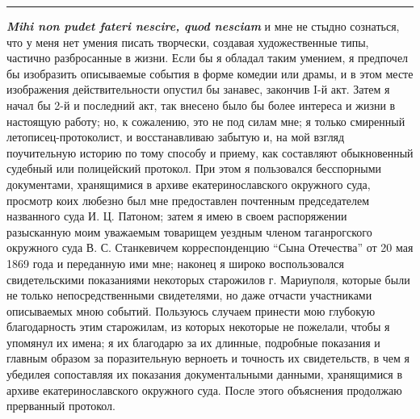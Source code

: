 \documentclass[a4paper,20pt]{report}
\begin{document}
\par\noindent\rule{\textwidth}{0.4pt}

\textbf{\em Mihi non pudet fateri nescire, quod nesciam} и мне не стыдно сознаться, что у
меня нет умения писать творчески, создавая художественные типы, частично
разбросанные в жизни.  Если бы я обладал таким умением, я предпочел бы
изобразить описываемые события в форме комедии или драмы, и в этом месте
изображения действительности опустил бы занавес, закончив I-й акт.
Затем я начал бы 2-й и последний акт, так внесено было бы более интереса и жизни в настоящую работу;
но, к сожалению, это не под силам мне; я только смиренный летописец-протоколист, и восстанавливаю
забытую и, на мой взгляд поучительную историю по тому способу и приему, как составляют обыкновенный судебный или
полицейский протокол. При этом я пользовался бесспорными документами, хранящимися в архиве екатеринославского
окружного суда, просмотр коих любезно был мне предоставлен почтенным председателем
названного суда И. Ц. Патоном; затем я имею в своем распоряжении разысканную моим уважаемым 
товарищем уездным членом таганрогского окружного суда В. С. Станкевичем корреспонденцию 
``Сына Отечества'' от 20 мая 1869 года и переданную ими мне; наконец я широко воспользовался свидетельскими 
показаниями некоторых старожилов г. Мариуполя, которые были не только непосредственными 
свидетелями, но даже отчасти участниками описываемых мною событий.
Пользуюсь случаем принести мою глубокую благодарность этим старожилам, из
которых некоторые не пожелали, чтобы я упомянул их имена; я их благодарю за их
длинные, подробные показания и главным образом за поразительную верноеть и
точность их свидетельств, в чем я убедилея сопоставляя их показания
документальными данными, хранящимися в архиве екатеринославского окружного
суда. После этого объяснения продолжаю прерванный протокол.
\end{document}
